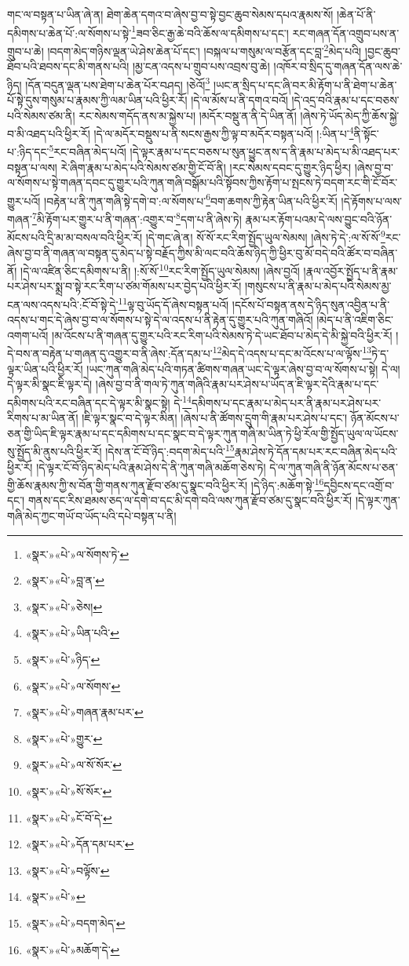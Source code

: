 གང་ལ་བསྟན་པ་ཡིན་ཞེ་ན། ཐེག་ཆེན་དགའ་བ་ཞེས་བྱ་བ་སྟེ་བྱང་ཆུབ་སེམས་དཔའ་རྣམས་སོ། །ཆེན་པོ་ནི་དམིགས་པ་ཆེན་པོ་:ལ་སོགས་པ་སྟེ་\footnote{«སྣར་»«པེ་»ལ་སོགས་ཏེ་}ཟབ་ཅིང་རྒྱ་ཆེ་བའི་ཆོས་ལ་དམིགས་པ་དང་། རང་གཞན་དོན་འགྲུབ་པས་ན་གྲུབ་པ་ཆེ། །བདག་མེད་གཉིས་ལྡན་ཡེ་ཤེས་ཆེན་པོ་དང་། །བསྐལ་པ་གསུམ་ལ་བརྩོན་དང་བླ་\footnote{«སྣར་»«པེ་»བླ་ན་}མེད་པའི། །བྱང་ཆུབ་ཐོབ་པའི་ཐབས་དང་མི་གནས་པའི། །མྱ་ངན་འདས་པ་གྲུབ་པས་འབྲས་བུ་ཆེ། །འཁོར་བ་སྲིད་དུ་གཞན་དོན་ལས་ཆེ་ཉིད། །དོན་བདུན་ལྡན་པས་ཐེག་པ་ཆེན་པོར་བཤད། །ཅེའོ།\footnote{«སྣར་»«པེ་»ཅེས།} །ཡང་ན་སྲིད་པ་དང་ཞི་བར་མི་རྟོག་པ་ནི་ཐེག་པ་ཆེན་པོ་སྟེ་དུས་གསུམ་པ་རྣམས་ཀྱི་ལམ་ཡིན་པའི་ཕྱིར་རོ། །དེ་ལ་མོས་པ་ནི་དགའ་བའོ། །དེ་འདྲ་བའི་རྣམ་པ་དང་བཅས་པའི་སེམས་ཙམ་ནི། རང་སེམས་གདོད་ནས་མ་སྐྱེས་པ། །མདོར་བསྡུ་ན་ནི་དེ་ཡིན་ནོ། །ཞེས་ཏེ་ཡོད་མེད་ཀྱི་ཆོས་སྐྱེ་བ་མི་འཐད་པའི་ཕྱིར་རོ། །དེ་ལ་མདོར་བསྡུས་པ་ནི་སངས་རྒྱས་ཀྱི་ལྟ་བ་མདོར་བསྟན་པའོ། །:ཡིན་པ་\footnote{«སྣར་»«པེ་»ཡིན་པའི་}ནི་སྟོང་པ་:ཉིད་དང་\footnote{«སྣར་»«པེ་»ཉིད་}རང་བཞིན་མེད་པའོ། །དེ་ལྟར་རྣམ་པ་དང་བཅས་པ་སུན་ཕྱུང་ནས་ད་ནི་རྣམ་པ་མེད་པ་མི་འཐད་པར་བསྟན་པ་ལས། རེ་ཞིག་རྣམ་པ་མེད་པའི་སེམས་ཙམ་གྱི་ངོ་བོ་ནི། །རང་སེམས་དབང་དུ་གྱུར་ཉིད་ཕྱིར། །ཞེས་བྱ་བ་ལ་སོགས་པ་སྟེ་གཞན་དབང་དུ་གྱུར་པའི་ཀུན་གཞི་བསྒོམ་པའི་སྟོབས་ཀྱིས་རྟོག་པ་སྤངས་ཏེ་བདག་རང་གི་ངོ་བོར་གྱུར་པའོ། །བརྟེན་པ་ནི་ཀུན་གཞི་སྟེ་དགེ་བ་:ལ་སོགས་པ་\footnote{«སྣར་»«པེ་»ལ་སོགས་}བག་ཆགས་ཀྱི་རྟེན་ཡིན་པའི་ཕྱིར་རོ། །དེ་རྟོགས་པ་ལས་གཞན་\footnote{«སྣར་»«པེ་»གཞན་རྣམ་པར་}མི་རྟོག་པར་གྱུར་པ་ནི་གཞན་:འགྱུར་བ་\footnote{«སྣར་»«པེ་»གྱུར་}དག་པ་ནི་ཞེས་ཏེ། རྣམ་པར་རྟོག་པའམ་དེ་ལས་བྱུང་བའི་ཉོན་མོངས་པའི་དྲི་མ་མ་བསལ་བའི་ཕྱིར་རོ། །དེ་གང་ཞེ་ན། སོ་སོ་རང་རིག་སྤྱོད་ཡུལ་སེམས། །ཞེས་ཏེ་དེ་:ལ་སོ་སོ་\footnote{«སྣར་»«པེ་»ལ་སོ་སོར་}རང་ཞེས་བྱ་བ་ནི་གཞན་ལ་བསྟན་དུ་མེད་པ་སྟེ་བརྗོད་ཀྱིས་མི་ལང་བའི་ཆོས་ཉིད་ཀྱི་ཕྱིར་བུ་མོ་བདེ་བའི་ཚོར་བ་བཞིན་ནོ། །དེ་ལ་འཛིན་ཅིང་དམིགས་པ་ནི། །:སོ་སོ་\footnote{«སྣར་»«པེ་»སོ་སོར་}རང་རིག་སྤྱོད་ཡུལ་སེམས། །ཞེས་བྱའོ། །རྣལ་འབྱོར་སྤྱོད་པ་ནི་རྣམ་པར་ཤེས་པར་སྨྲ་བ་སྟེ་རང་རིག་པ་ཙམ་གོམས་པར་བྱེད་པའི་ཕྱིར་རོ། །གསུངས་པ་ནི་རྣམ་པ་མེད་པའི་སེམས་མྱ་ངན་ལས་འདས་པའི་:ངོ་བོ་སྟེ་དེ་\footnote{«སྣར་»«པེ་»ངོ་བོ་དེ་}ལྟ་བུ་ཡོད་དོ་ཞེས་བསྟན་པའོ། །དངོས་པོ་བསྟན་ནས་དེ་ཉིད་སུན་འབྱིན་པ་ནི་འདས་པ་གང་དེ་ཞེས་བྱ་བ་ལ་སོགས་པ་སྟེ་དེ་ལ་འདས་པ་ནི་རྟེན་དུ་གྱུར་པའི་ཀུན་གཞིའོ། །མེད་པ་ནི་འཇིག་ཅིང་འགག་པའོ། །མ་འོངས་པ་ནི་གཞན་དུ་གྱུར་པའི་རང་རིག་པའི་སེམས་ཏེ་དེ་ཡང་ཐོབ་པ་མེད་དེ་མི་སྐྱེ་བའི་ཕྱིར་རོ། །དེ་བས་ན་བརྟེན་པ་གཞན་དུ་འགྱུར་བ་ནི་ཞེས་:དོན་དམ་པ་\footnote{«སྣར་»«པེ་»དོན་དམ་པར་}མེད་དེ་འདས་པ་དང་མ་འོངས་པ་ལ་ལྟོས་\footnote{«སྣར་»«པེ་»བལྟོས་}ཏེ་ད་ལྟར་ཡིན་པའི་ཕྱིར་རོ། །ཡང་ཀུན་གཞི་མེད་པའི་གཏན་ཚིགས་གཞན་ཡང་དེ་ལྟར་ཞེས་བྱ་བ་ལ་སོགས་པ་སྟེ། དེ་ལ། དེ་ལྟར་མི་སྣང་ཇི་ལྟར་དེ། །ཞེས་བྱ་བ་ནི་གལ་ཏེ་ཀུན་གཞིའི་རྣམ་པར་ཤེས་པ་ཡོད་ན་ཇི་ལྟར་དེའི་རྣམ་པ་དང་དམིགས་པའི་རང་བཞིན་དང་དེ་ལྟར་མི་སྣང་སྟེ། དེ་\footnote{«སྣར་»«པེ་»}དམིགས་པ་དང་རྣམ་པ་མེད་པར་ནི་རྣམ་པར་ཤེས་པར་རིགས་པ་མ་ཡིན་ནོ། །ཇི་ལྟར་སྣང་བ་དེ་ལྟར་མིན། །ཞེས་པ་ནི་ཚོགས་དྲུག་གི་རྣམ་པར་ཤེས་པ་དང་། ཉོན་མོངས་པ་ཅན་གྱི་ཡིད་ཇི་ལྟར་རྣམ་པ་དང་དམིགས་པ་དང་སྣང་བ་དེ་ལྟར་ཀུན་གཞི་མ་ཡིན་ཏེ་ཕྱི་རོལ་གྱི་སྤྱོད་ཡུལ་ལ་ཡོངས་སུ་སྤྱོད་མི་ནུས་པའི་ཕྱིར་རོ། །དེས་ན་ངོ་བོ་ཉིད་:བདག་མེད་པའི་\footnote{«སྣར་»«པེ་»བདག་མེད་}རྣམ་ཤེས་ཏེ་དོན་དམ་པར་རང་བཞིན་མེད་པའི་ཕྱིར་རོ། །དེ་ལྟར་ངོ་བོ་ཉིད་མེད་པའི་རྣམ་ཤེས་དེ་ནི་ཀུན་གཞི་མཆོག་ཅེས་ཏེ། དེ་ལ་ཀུན་གཞི་ནི་ཉོན་མོངས་པ་ཅན་གྱི་ཆོས་རྣམས་ཀྱི་ས་བོན་གྱི་གནས་ཀུན་རྫོབ་ཙམ་དུ་སྣང་བའི་ཕྱིར་རོ། །དེ་ཉིད་:མཆོག་སྟེ་\footnote{«སྣར་»«པེ་»མཆོག་དེ་}དབྱིངས་དང་འགྲོ་བ་དང་། གནས་དང་རིས་ཐམས་ཅད་ལ་དགེ་བ་དང་མི་དགེ་བའི་ལས་ཀུན་རྫོབ་ཙམ་དུ་སྣང་བའི་ཕྱིར་རོ། །དེ་ལྟར་ཀུན་གཞི་མེད་ཀྱང་གཡོ་བ་ཡོད་པའི་དཔེ་བསྟན་པ་ནི། 